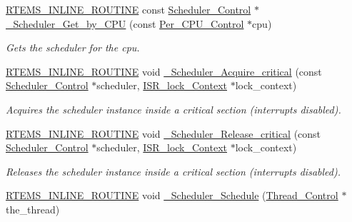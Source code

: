 \begin{DoxyCompactItemize}
\mbox{\hyperlink{group__RTEMSScoreBaseDefs_gac216239df231d5dbd15e3520b0b9313f}{R\+T\+E\+M\+S\+\_\+\+I\+N\+L\+I\+N\+E\+\_\+\+R\+O\+U\+T\+I\+NE}} const \mbox{\hyperlink{struct__Scheduler__Control}{Scheduler\+\_\+\+Control}} $\ast$ \mbox{\hyperlink{group__RTEMSScoreScheduler_ga3cda9503f298154212ed6819256c46d9}{\+\_\+\+Scheduler\+\_\+\+Get\+\_\+by\+\_\+\+C\+PU}} (const \mbox{\hyperlink{structPer__CPU__Control}{Per\+\_\+\+C\+P\+U\+\_\+\+Control}} $\ast$cpu)
\begin{DoxyCompactList}\small\item\em Gets the scheduler for the cpu. \end{DoxyCompactList}\item 
\mbox{\hyperlink{group__RTEMSScoreBaseDefs_gac216239df231d5dbd15e3520b0b9313f}{R\+T\+E\+M\+S\+\_\+\+I\+N\+L\+I\+N\+E\+\_\+\+R\+O\+U\+T\+I\+NE}} void \mbox{\hyperlink{group__RTEMSScoreScheduler_ga9e6cf07526560aa067d7bcb92a7aa964}{\+\_\+\+Scheduler\+\_\+\+Acquire\+\_\+critical}} (const \mbox{\hyperlink{struct__Scheduler__Control}{Scheduler\+\_\+\+Control}} $\ast$scheduler, \mbox{\hyperlink{structISR__lock__Context}{I\+S\+R\+\_\+lock\+\_\+\+Context}} $\ast$lock\+\_\+context)
\begin{DoxyCompactList}\small\item\em Acquires the scheduler instance inside a critical section (interrupts disabled). \end{DoxyCompactList}\item 
\mbox{\hyperlink{group__RTEMSScoreBaseDefs_gac216239df231d5dbd15e3520b0b9313f}{R\+T\+E\+M\+S\+\_\+\+I\+N\+L\+I\+N\+E\+\_\+\+R\+O\+U\+T\+I\+NE}} void \mbox{\hyperlink{group__RTEMSScoreScheduler_gae4d084e50d4f8a616f394312b66df32b}{\+\_\+\+Scheduler\+\_\+\+Release\+\_\+critical}} (const \mbox{\hyperlink{struct__Scheduler__Control}{Scheduler\+\_\+\+Control}} $\ast$scheduler, \mbox{\hyperlink{structISR__lock__Context}{I\+S\+R\+\_\+lock\+\_\+\+Context}} $\ast$lock\+\_\+context)
\begin{DoxyCompactList}\small\item\em Releases the scheduler instance inside a critical section (interrupts disabled). \end{DoxyCompactList}\item 
\mbox{\hyperlink{group__RTEMSScoreBaseDefs_gac216239df231d5dbd15e3520b0b9313f}{R\+T\+E\+M\+S\+\_\+\+I\+N\+L\+I\+N\+E\+\_\+\+R\+O\+U\+T\+I\+NE}} void \mbox{\hyperlink{group__RTEMSScoreScheduler_ga8ae120060b9523ac05e0aaf3e9f2b4d9}{\+\_\+\+Scheduler\+\_\+\+Schedule}} (\mbox{\hyperlink{struct__Thread__Control}{Thread\+\_\+\+Control}} $\ast$the\+\_\+thread)

\end{DoxyCompactItemize}
